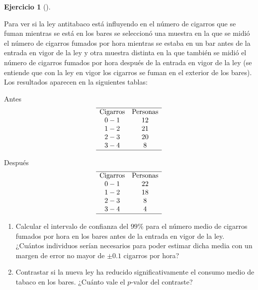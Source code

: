 \documentclass[
  spanish,
  a4paper,
]{scrreport}
\theoremstyle{definition}
\newtheorem{exercise}{Ejercicio}[chapter]
\theoremstyle{remark}
\begin{document}
\begin{exercise}[]\protect\hypertarget{exr-contraste-medias-cigarros}{}\label{exr-contraste-medias-cigarros}

Para ver si la ley antitabaco está influyendo en el número de cigarros
que se fuman mientras se está en los bares se seleccionó una muestra en
la que se midió el número de cigarros fumados por hora mientras se
estaba en un bar antes de la entrada en vigor de la ley y otra muestra
distinta en la que también se midió el número de cigarros fumados por
hora después de la entrada en vigor de la ley (se entiende que con la
ley en vigor los cigarros se fuman en el exterior de los bares). Los
resultados aparecen en la siguientes tablas:

Antes \[
\begin{array}{cc}
\hline
\mbox{Cigarros} & \mbox{Personas} \\
0-1 & 12\\
1-2 & 21\\
2-3 & 20\\
3-4 & 8\\
\hline
\end{array}
\]

Después \[
\begin{array}{cc}
\hline
\mbox{Cigarros} & \mbox{Personas} \\
0-1 & 22\\
1-2 & 18\\
2-3 & 8\\
3-4 & 4\\
\hline
\end{array}
\]

\begin{enumerate}
\def\labelenumi{\alph{enumi}.}
\item
  Calcular el intervalo de confianza del \(99\)\% para el número medio
  de cigarros fumados por hora en los bares antes de la entrada en vigor
  de la ley. ¿Cuántos individuos serían necesarios para poder estimar
  dicha media con un margen de error no mayor de \(\pm 0.1\) cigarros
  por hora?
\item
  Contrastar si la nueva ley ha reducido significativamente el consumo
  medio de tabaco en los bares. ¿Cuánto vale el \(p\)-valor del
  contraste?
\end{enumerate}

\end{exercise}
\end{document}
